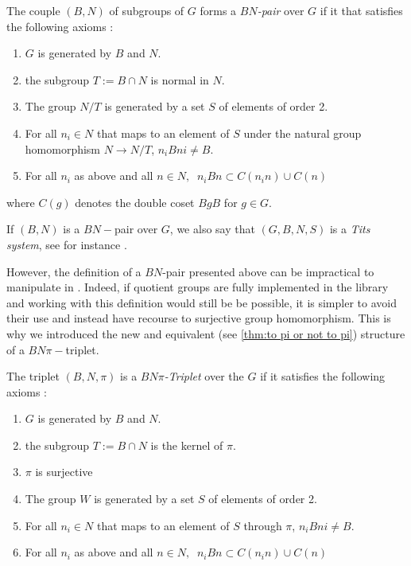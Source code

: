 \begin{definition}[$BN$-pair] \label{BN}
    The couple $\left( B,N \right)$ of subgroups of $G$ forms a \emph{$BN$-pair} over $G$ if it that satisfies the following axioms :
    \begin{enumerate}
        \item $G$ is generated by $B$ and $N$.
        \item the subgroup $T := B \cap N$ is normal in $N$.
        \item The group $N / T$ is generated by a set $S$ of elements of order 2.
        \item For all $n_{i} \in N$ that maps to an element of $S$ under the natural group homomorphism $N \to N / T$, $n_{i}Bni \neq B$.
        \item For all $n_{i}$ as above and all $n \in N, \ $ $n_i B n \subset C(n_in) \cup C(n)$
    \end{enumerate} where $C(g)$ denotes the double coset $BgB$ for $g \in G$.
\end{definition}

\begin{notation}
    If $\left( B,N \right)$ is a $BN-$pair over $G$, we also say that $\left( G, B, N, S \right)$ is a \emph{Tits system}, see for instance \cite{bourbaki_groupes_2007}.
\end{notation}

However, the definition of a $BN$-pair presented above can be impractical to manipulate in \Lean. Indeed, if quotient groups are fully implemented in the \Mathlib library and working with this definition would still be be possible, it is simpler to avoid their use and instead have recourse to surjective group homomorphism.
    This is why we introduced the new and equivalent (see \ref{thm:to pi or not to pi}) structure of a $BN\pi-$triplet.  %

\begin{definition}[$BN\pi$-Triplet] \label{BNpi}
  The triplet $\left( B,N, \pi \right)$ is a \emph{$BN\pi$-Triplet} over the $G$ if it satisfies the following axioms :
    \begin{enumerate}
        \item $G$ is generated by $B$ and $N$.
        \item the subgroup $T := B \cap N$ is the kernel of $\pi$.
        \item $\pi$ is surjective
        \item The group $W$ is generated by a set $S$ of elements of order 2.
        \item For all $n_{i} \in N$ that maps to an element of $S$ through $\pi$, $n_{i}Bni \neq B$.
        \item For all $n_{i}$ as above and all $n \in N, \ $ $n_i B n \subset C(n_in) \cup C(n)$
    \end{enumerate}
\end{definition}


